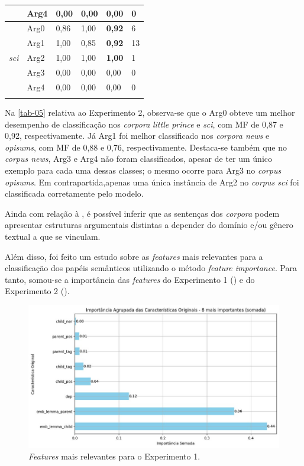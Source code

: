 \begin{table}[htpb]
\begin{threeparttable}
\begin{tabular}{*{6}{l}}
        & Arg4 & 0,00 & 0,00 & 0,00 & 0 \\
      \midrule
      \multirow{5}{*}{\emph{sci}} 
        & Arg0 & 0,86 & 1,00 & \textbf{0,92} & 6 \\
        & Arg1 & 1,00 & 0,85 & \textbf{0,92} & 13 \\
        & Arg2 & 1,00 & 1,00 & \textbf{1,00} & 1 \\
        & Arg3 & 0,00 & 0,00 & 0,00 & 0 \\
        & Arg4 & 0,00 & 0,00 & 0,00 & 0 \\
      \arrayrulecolor{black}
      \bottomrule
    \end{tabular}
  \end{threeparttable}
\end{table}


Na \cref{tab-05} relativa ao Experimento 2, observa-se que o Arg0 obteve um
melhor desempenho de classificação nos \emph{corpora} \emph{little
prince} e \emph{sci}, com MF de 0,87 e 0,92, respectivamente. Já Arg1
foi melhor classificado nos \emph{corpora news} e \emph{opisums}, com MF
de 0,88 e 0,76, respectivamente. Destaca-se também que no \emph{corpus
news}, Arg3 e Arg4 não foram classificados, apesar de ter um único
exemplo para cada uma dessas classes; o mesmo ocorre para Arg3 no
\emph{corpus opisums}. Em contrapartida,apenas uma única instância de
Arg2 no \emph{corpus sci} foi classificada corretamente pelo modelo.

Ainda com relação à , é possível inferir que as sentenças dos
\emph{corpora} podem apresentar estruturas argumentais distintas a
depender do domínio e/ou gênero textual a que se vinculam.

Além disso, foi feito um estudo sobre as \emph{features} mais relevantes
para a classificação dos papéis semânticos utilizando o método
\emph{feature importance}. Para tanto, somou-se a importância das
\emph{features} do Experimento 1 () e do Experimento 2 ().

\begin{figure}[htpb]
  \centering
  \begin{minipage}{.75\textwidth}
  \includegraphics[width=\textwidth]{figure06.jpg}
  \caption{\emph{Features} mais relevantes para o Experimento 1.}
  \label{fig-06}
  \end{minipage}
\end{figure}


